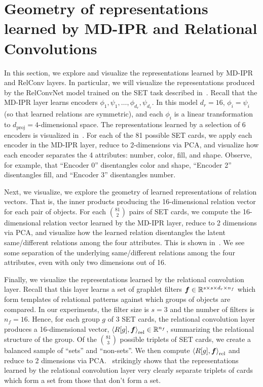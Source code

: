 \section{Geometry of representations learned by MD-IPR and Relational Convolutions}\label{sec:appendix_rep_analysis}

In this section, we explore and visualize the representations learned by MD-IPR and RelConv layers. In particular, we will visualize the representations produced by the RelConvNet model trained on the SET task described in~. Recall that the MD-IPR layer learns encoders $\phi_1, \psi_1, \ldots, \phi_{d_r}, \psi_{d_r}$. In this model $d_r = 16$, $\phi_i = \psi_i$ (so that learned relations are symmetric), and each $\phi_i$ is a linear transformation to $d_{\mathrm{proj}} = 4$-dimensional space. The representations learned by a selection of 6 encoders is visualized in~. For each of the 81 possible SET cards, we apply each encoder in the MD-IPR layer, reduce to 2-dimensions via PCA, and visualize how each encoder separates the 4 attributes: number, color, fill, and shape. Observe, for example, that ``Encoder 0'' disentangles color and shape, ``Encoder 2'' disentangles fill, and ``Encoder 3'' disentangles number.

Next, we visualize, we explore the geometry of learned representations of relation vectors. That is, the inner products producing the 16-dimensional relation vector for each pair of objects. For each $\binom{81}{2}$ pairs of SET cards, we compute the 16-dimensional relation vector learned by the MD-IPR layer, reduce to 2 dimensions via PCA, and visualize how the learned relation disentangles the latent same/different relations among the four attributes. This is shown in~. We see some separation of the underlying same/different relations among the four attributes, even with only two dimensions out of 16.

Finally, we visualize the representations learned by the relational convolution layer. Recall that this layer learns a set of graphlet filters $\bm{f} \in \mathbb{R}^{s \times s \times d_r \times n_f}$ which form templates of relational patterns against which groups of objects are compared. In our experiments, the filter size is $s = 3$ and the number of filters is $n_f = 16$. Hence, for each group $g$ of 3 SET cards, the relational convolution layer produces a 16-dimensional vector, $\left\langle R[g], \bm{f} \right\rangle_\mathrm{rel} \in \mathbb{R}^{n_f}$, summarizing the relational structure of the group. Of the $\binom{81}{3}$ possible triplets of SET cards, we create a balanced sample of ``sets'' and ``non-sets''. We then compute $\left\langle R[g], \bm{f} \right\rangle_\mathrm{rel}$ and reduce to 2 dimensions via PCA.~ strikingly shows that the representations learned by the relational convolution layer very clearly separate triplets of cards which form a set from those that don't form a set.


